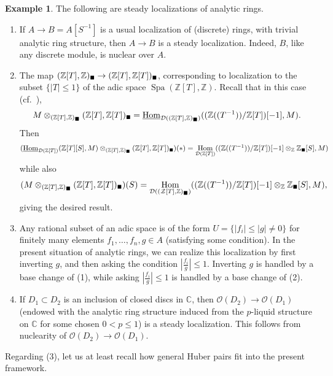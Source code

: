 \documentclass[11pt]{amsbook}
\DeclareMathOperator{\Spa}{Spa}
\DeclareMathOperator{\Hom}{Hom}
\newcommand{\intHom}{\underline{\Hom}}
\newcommand{\solid}{{\mathsmaller{\blacksquare}}}
\numberwithin{equation}{section}
\numberwithin{theorem}{section}
\theoremstyle{definition}
\newtheorem{example}[theorem]{Example}
\begin{document}
\begin{example} The following are steady localizations of analytic rings.
\begin{enumerate}
\item If $A\to B=A[S^{-1}]$ is a usual localization of (discrete) rings, with trivial analytic ring structure, then $A\to B$ is a steady localization. Indeed, $B$, like any discrete module, is nuclear over $A$.
\item The map $(\mathbb Z[T],\mathbb Z)_\solid\to (\mathbb Z[T],\mathbb Z[T])_\solid$, corresponding to localization to the subset $\{|T|\leq 1\}$ of the adic space $\Spa(\mathbb Z[T],\mathbb Z)$. Recall that in this case (cf.~\cite[Lecture VII]{Condensed}),
\[
M\otimes_{(\mathbb Z[T],\mathbb Z)_\solid} (\mathbb Z[T],\mathbb Z[T])_\solid = \intHom_{\mathcal D((\mathbb Z[T],\mathbb Z)_\solid)}((\mathbb Z((T^{-1}))/\mathbb Z[T])[-1],M).
\]
Then
\[
(\intHom_{\mathcal D(\mathbb Z[T])}(\mathbb Z[T][S],M)\otimes_{(\mathbb Z[T],\mathbb Z)_\solid} (\mathbb Z[T],\mathbb Z[T])_\solid)(\ast) = \Hom_{\mathcal D(\mathbb Z[T])}((\mathbb Z((T^{-1}))/\mathbb Z[T])[-1]\otimes_{\mathbb Z}\mathbb Z_\solid[S],M)
\]
while also
\[
(M\otimes_{(\mathbb Z[T],\mathbb Z)_\solid} (\mathbb Z[T],\mathbb Z[T])_\solid)(S) = \Hom_{\mathcal D((\mathcal Z[T],\mathbb Z)_\solid)}((\mathbb Z((T^{-1}))/\mathbb Z[T])[-1]\otimes_{\mathbb Z}\mathbb Z_\solid[S],M),
\]
giving the desired result.
\item Any rational subset of an adic space is of the form $U=\{|f_i|\leq |g|\neq 0\}$ for finitely many elements $f_1,\ldots,f_n,g\in A$ (satisfying some condition). In the present situation of analytic rings, we can realize this localization by first inverting $g$, and then asking the condition $|\frac{f_i}g|\leq 1$. Inverting $g$ is handled by a base change of (1), while asking $|\frac{f_i}g|\leq 1$ is handled by a base change of (2).
\item If $D_1\subset D_2$ is an inclusion of closed discs in $\mathbb C$, then $\mathcal O(D_2)\to \mathcal O(D_1)$ (endowed with the analytic ring structure induced from the $p$-liquid structure on $\mathbb C$ for some chosen $0<p\leq 1$) is a steady localization. This follows from nuclearity of $\mathcal O(D_2)\to \mathcal O(D_1)$.
\end{enumerate}
\end{example}

Regarding (3), let us at least recall how general Huber pairs fit into the present framework.
\end{document}
